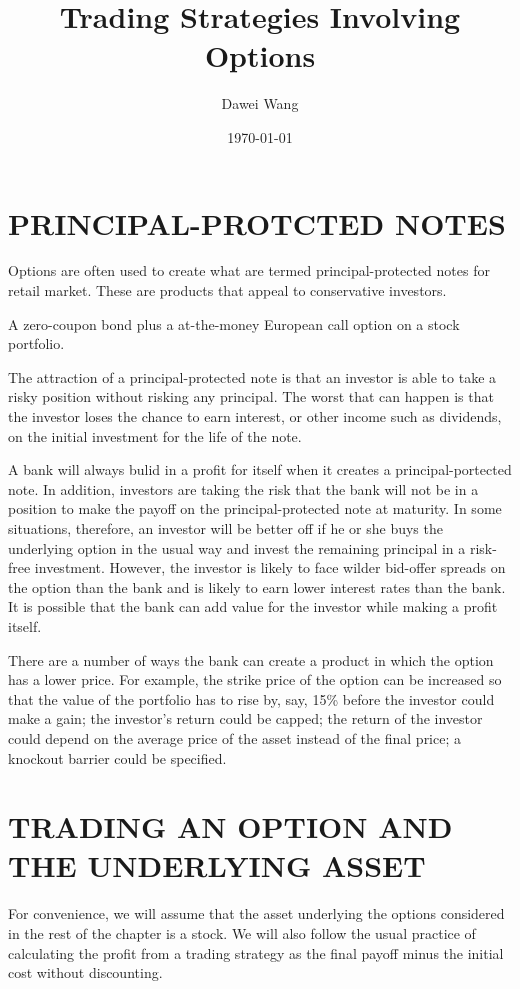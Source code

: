 \documentclass{article}
\title{Trading Strategies Involving Options}
\author{Dawei Wang}
\date{\today}
\begin{document}
	\maketitle
\section{PRINCIPAL-PROTCTED NOTES}
Options are often used to create what are termed principal-protected notes for retail market. These are products that appeal to conservative investors.

A zero-coupon bond plus a at-the-money European call option on a stock portfolio.

The attraction of a principal-protected note is that an investor is able to take a risky position without risking any principal. The worst that can happen is that the investor loses the chance to earn interest, or other income such as dividends, on the initial investment for the life of the note.

A bank will always bulid in a profit for itself when it creates a principal-portected note. In addition, investors are taking the risk that the bank will not be in a position to make the payoff on the principal-protected note at maturity. In some situations, therefore, an investor will be better off if he or she buys the underlying option in the usual way and invest the remaining principal in a risk-free investment. However, the investor is likely to face wilder bid-offer spreads on the option than the bank and is likely to earn lower interest rates than the bank. It is possible that the bank can add value for the investor while making a profit itself.

There are a number of ways the bank can create a product in which the option has a lower price. For example, the strike price of the option can be increased so that the value of the portfolio has to rise by, say, 15\% before the investor could make a gain; the investor's return could be capped; the return of the investor could depend on the average price of the asset instead of the final price; a knockout barrier could be specified.

\section{TRADING AN OPTION AND THE UNDERLYING ASSET}
For convenience, we will assume that the asset underlying the options considered in the rest of the chapter is a stock. We will also follow the usual practice of calculating the profit from a trading strategy as the final payoff minus the initial cost without discounting.
\end{document}
